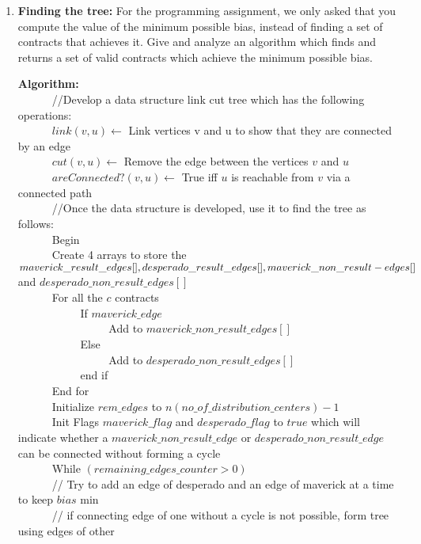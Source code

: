 \documentclass[12pt]{article}
\begin{document}
\begin{enumerate}
\pagebreak
\item \textbf{Finding the tree:} For the programming assignment, we only asked that you compute the value of the minimum possible bias, instead of finding a set of contracts that achieves it. Give and analyze an algorithm which finds and returns a set of valid contracts which achieve the minimum possible bias.

\textbf{Algorithm:}\\
\verb|		|//Develop a data structure link cut tree which has the following operations:\\
\verb|		|$link(v, u) \leftarrow $ Link vertices v and u to show that they are connected by an edge\\
\verb|		|$cut(v, u) \leftarrow$ Remove the edge between the vertices $v$ and $u$\\
\verb|		|$areConnected?(v, u) \leftarrow$ True iff $u$ is reachable from $v$ via a connected path\\
\verb|		|//Once the data structure is developed, use it to find the tree as follows:\\
\verb|		|Begin\\
\verb|		|Create 4 arrays to store the $maverick\_result\_edges[], desperado\_result\_edges[],\\ maverick\_non\_result-edges[]$ and $desperado\_non\_result\_edges[]$\\
\verb|		|For all the $c$ contracts \\
\verb|		|\verb|		|If $maverick\_edge$\\
\verb|		|\verb|		|\verb|		|Add to $maverick\_non\_result\_edges[]$\\
\verb|		|\verb|		|Else\\
\verb|		|\verb|		|\verb|		|Add to $desperado\_non\_result\_edges[]$\\
\verb|		|\verb|		|end if\\
\verb|		|End for\\
\verb|		|Initialize $rem\_edges$ to $n (no\_of\_distribution\_centers) - 1$\\
\verb|		|Init Flags $maverick\_flag$ and $desperado\_flag$ to $true$ which will indicate whether a $maverick\_non\_result\_edge$ or $desperado\_non\_result\_edge$ can be connected without forming a cycle \\
\verb|		|While $(remaining\_edges\_counter > 0)$\\
\verb|		|// Try to add an edge of desperado and an edge of maverick at a time to keep $bias$ min\\
\verb|		|// if connecting edge of one without a cycle is not possible, form tree using edges of other \\

\end{enumerate}
\end{document}
